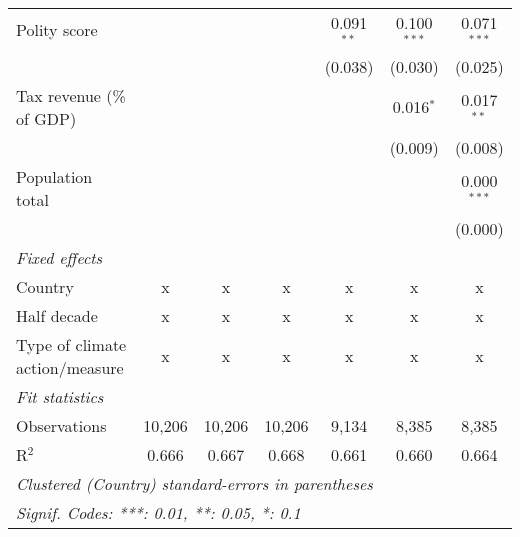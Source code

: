 \begin{tabular}{lcccccc}
   Polity score                                                   &         &               &                & 0.091$^{**}$   & 0.100$^{***}$  & 0.071$^{***}$\\   
                                                                  &         &               &                & (0.038)        & (0.030)        & (0.025)\\   
   Tax revenue (\% of GDP)                                        &         &               &                &                & 0.016$^{*}$    & 0.017$^{**}$\\   
                                                                  &         &               &                &                & (0.009)        & (0.008)\\   
   Population total                                               &         &               &                &                &                & 0.000$^{***}$\\   
                                                                  &         &               &                &                &                & (0.000)\\   
   \emph{Fixed effects}\\
   Country                                                        & x       & x             & x              & x              & x              & x\\  
   Half decade                                                    & x       & x             & x              & x              & x              & x\\  
   Type of climate action/measure                                 & x       & x             & x              & x              & x              & x\\  
   \midrule \emph{Fit statistics}\\
   Observations                                                   & 10,206  & 10,206        & 10,206         & 9,134          & 8,385          & 8,385\\  
   R$^2$                                                          & 0.666   & 0.667         & 0.668          & 0.661          & 0.660          & 0.664\\  
   \midrule
   \multicolumn{7}{l}{\emph{Clustered (Country) standard-errors in parentheses}}\\
   \multicolumn{7}{l}{\emph{Signif. Codes: ***: 0.01, **: 0.05, *: 0.1}}\\
\end{tabular}
\par\endgroup


